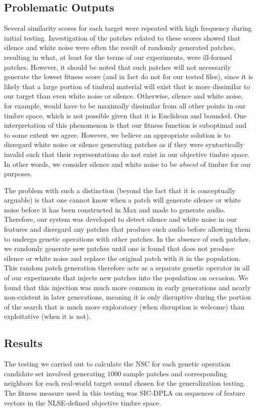 \documentclass[a4paper,12pt]{report} 	%
\numberwithin{figure}{chapter}
\numberwithin{table}{chapter}
\numberwithin{equation}{chapter}
\begin{document}
\begin{flushleft}
\subsection{Problematic Outputs}
Several similarity scores for each target were repeated with high frequency during initial testing. Investigation of the patches related to these scores showed that silence and white noise were often the result of randomly generated patches, resulting in what, at least for the terms of our experiments, were ill-formed patches. However, it should be noted that such patches will not necessarily generate the lowest fitness score (and in fact do not for our tested files), since it is likely that a large portion of timbral material will exist that is more dissimilar to our target than even white noise or silence. Otherwise, silence and white noise, for example, would have to be maximally dissimilar from all other points in our timbre space, which is not possible given that it is Euclidean and bounded. One interpretation of this phenomenon is that our fitness function is suboptimal and to some extent we agree. However, we believe an appropriate solution is to disregard white noise or silence generating patches as if they were syntactically invalid such that their representations do not exist in our objective timbre space. In other words, we consider silence and white noise to be \emph{absent} of timbre for our purposes.

The problem with such a distinction (beyond the fact that it is conceptually arguable) is that one cannot know when a patch will generate silence or white noise before it has been constructed in Max and made to generate audio. Therefore, our system was developed to detect silence and white noise in our features and disregard any patches that produce such audio before allowing them to undergo genetic operations with other patches. In the absence of such patches, we randomly generate new patches until one is found that does not produce silence or white noise and replace the original patch with it in the population. This random patch generation therefore acts as a separate genetic operator in all of our experiments that injects new patches into the population on occasion. We found that this injection was much more common in early generations and nearly non-existent in later generations, meaning it is only disruptive during the portion of the search that is much more exploratory (when disruption is welcome) than exploitative (when it is not).
\subsection{Results}
The testing we carried out to calculate the NSC for each genetic operation candidate set involved generating $1000$ sample patches and corresponding neighbors for each real-world target sound chosen for the generalization testing. The fitness measure used in this testing was SIC-DPLA on sequences of feature vectors in the NLSE-defined objective timbre space.


\end{flushleft}
\end{document}
